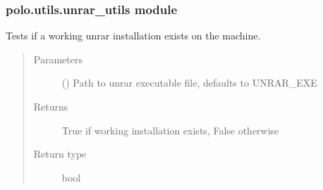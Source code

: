 \documentclass[letterpaper,10pt,english]{sphinxmanual}
\begin{document}
\subsubsection{polo.utils.unrar\_utils module}
\label{\detokenize{polo.utils:module-polo.utils.unrar_utils}}\label{\detokenize{polo.utils:polo-utils-unrar-utils-module}}

\begin{fulllineitems}
\label{\detokenize{polo.utils:polo.utils.unrar_utils.test_for_working_unrar}}
Tests if a working unrar installation exists on the machine.
\begin{quote}\begin{description}
\item[{Parameters}] \leavevmode
{} (\sphinxstyleliteralemphasis{\sphinxupquote{, }}) \textendash{} Path to unrar executable file, defaults to UNRAR\_EXE

\item[{Returns}] \leavevmode
True if working installation exists, False otherwise

\item[{Return type}] \leavevmode
bool

\end{description}\end{quote}

\end{fulllineitems}

\end{document}

